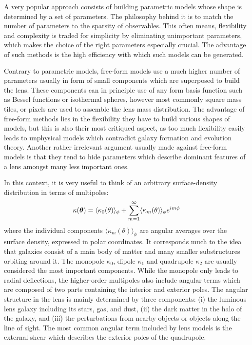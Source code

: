 A very popular approach consists of building parametric models whose shape is
determined by a set of parameters.  The philosophy behind it is to match the
number of parameters to the sparsity of observables.  This often means,
flexibility and complexity is traded for simplicity by eliminating unimportant
parameters, which makes the choice of the right parameters especially crucial.
The advantage of such methods is the high efficiency with which such models can
be generated.  

Contrary to parametric models, free-form models use a much higher number of
parameters usually in form of small components which are superposed to build the
lens.  These components can in principle use of any form basis function such as
Bessel functions or isothermal spheres, however most commonly square mass tiles,
or pixels are used to assemble the lens mass distribution.  The advantage of
free-form methods lies in the flexibility they have to build various shapes of
models, but this is also their most critiqued aspect, as too much flexibility
easily leads to unphysical models which contradict galaxy formation and
evolution theory.  Another rather irrelevant argument usually made against
free-form models is that they tend to hide parameters which describe dominant
features of a lens amongst many less important ones.  

In this context, it is very useful to think of an arbitrary surface-density
distribution in terms of multipoles:
%
\begin{equation}\eqlbl{match:multipoles}%
  \kappa(\bm\theta) = \langle\kappa_0(\theta)\rangle_{\phi} 
  + \sum^{\infty}_{m=1} \langle\kappa_{m}(\theta)\rangle_{\phi} e^{im\phi}
\end{equation}%
%
where the individual components $\langle\kappa_{m}(\theta)\rangle_{\phi}$ are
angular averages over the surface density, expressed in polar coordinates.  It
corresponds much to the idea that galaxies consist of a main body of matter and
many smaller substructures orbiting around it.  The monopole $\kappa_0$, dipole
$\kappa_1$ and quadrupole $\kappa_2$ are usually considered the most important
components.  While the monopole only leads to radial deflections, the
higher-order multipoles also include angular terms which are composed of two
parts containing the interior and exterior poles.  The angular structure in the
lens is mainly determined by three components: (i) the luminous lens galaxy
including its stars, gas, and dust, (ii) the dark matter in the halo of the
galaxy, and (iii) the perturbations from nearby objects or objects along the
line of sight.  The most common angular term included by lens models is the
external shear which describes the exterior poles of the quadrupole.

